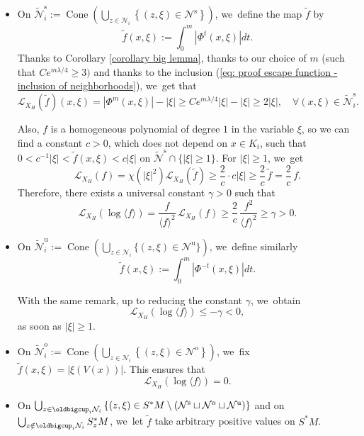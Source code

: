\documentclass[JEP,XML,SOM,Unicode,NoEqCountersInSection,NoFloatCountersInSection,published]{cedram}
\newcommand{\ro}{\mathrm{o}}
\newcommand{\rs}{\mathrm{s}}
\newcommand{\ru}{\mathrm{u}}
\theoremstyle{definition}
\theoremstyle{plain}
\newcommand{\Lie}{\mathcal{L}}
\newcommand{\Ncal}{\mathcal{N}}
\newcommand{\w}[1]{\langle {#1} \rangle}
\DeclareMathOperator{\Cone}{Cone}
\begin{document}
\begin{itemize}
\item On $\widetilde{\Ncal}_i^\rs:= \Cone \left(\bigcup_{z \in \Ncal_i} \left\{(z,\xi) \in \Ncal^\rs \right\}\right)$, we~define the map $\tilde{f}$ by
\[
\widetilde{f} (x,\xi):= \int_0^m |\Phi^t (x,\xi)| dt.
\]
Thanks to Corollary \ref{corollary big lemma}, thanks to our choice of $m$ (such that $C e^{m \lambda /4} \geq 3)$ and thanks to the inclusion (\ref{eq: proof escape function - inclusion of neighborhoods}), we~get that
\[
\Lie_{X_H} (\tilde{f})(x,\xi) = |\Phi^m (x,\xi)| - |\xi| \geq Ce^{m\lambda/4} |\xi| - |\xi| \geq 2 |\xi|, \quad \forall (x,\xi) \in \widetilde{\Ncal}_i^\rs.
\]

Also, $f$ is a homogeneous polynomial of degree $1$ in the variable $\xi$, so we can find a constant $c > 0$, which does not depend on $x \in K_i$, such that $0 < c^{-1} |\xi| < \widetilde{f} (x,\xi) < c |\xi|$ on $\widetilde{\Ncal}^\rs \cap \{|\xi| \geq 1\}$. For $|\xi| \geq 1$, we~get
\[
\Lie_{X_H} (f) = \chi (|\xi|^2) \Lie_{X_H} (\tilde{f}) \geq \frac{2}{c}\cdot c|\xi| \geq \frac{2}{c}\, \tilde{f} = \frac{2}{c}\, f.
\]
Therefore, there exists a universal constant $\gamma > 0$ such that
\begin{equation}\label{eq: proof escape function - estimate 1 on f}
\Lie_{X_H} (\log \w{f}) = \frac{f}{\w{f}^2}\, \Lie_{X_H} (f) \geq \frac{2}{c}\, \frac{f^2}{\w{f}^2} \geq \gamma > 0.
\end{equation}
\item On $\widetilde{\Ncal}_i^\ru:= \Cone \left(\bigcup_{z \in \Ncal_i} \{(z,\xi) \in \Ncal^\ru \} \right)$, we~define similarly
\[
\tilde{f}(x,\xi):= \int_0^m |\Phi^{-t} (x,\xi)| dt.
\]

With the same remark, up to reducing the constant $\gamma$, we~obtain
\begin{equation}\label{eq: proof escape function - estimate 2 on f}
\Lie_{X_H} (\log \w{f}) \leq -\gamma < 0,
\end{equation}
as soon as $|\xi| \geq 1$.
\item On $\widetilde{\Ncal}_i^\ro:= \Cone \left(\bigcup_{z \in \Ncal_i} \left\{ (z,\xi) \in \Ncal^\ro \right\} \right)$, we~fix $\tilde{f} (x,\xi) = |\xi (V (x))|$. This ensures that
\[
\Lie_{X_H} (\log \w{f}) = 0.
\]
\item On $ \bigcup_{z \in \oldbigcup_i \Ncal_i} \left\{ (z,\xi) \in S^* M \setminus \left(\Ncal^\rs \sqcup \Ncal^\ro \sqcup \Ncal^\ru \right) \right\}$ and on $\bigcup_{z \notin \oldbigcup_{i} \Ncal_i} S_z^* M$, we~let $\tilde{f}$ take arbitrary positive values on $S^*M$.
\end{itemize}
\end{document}
